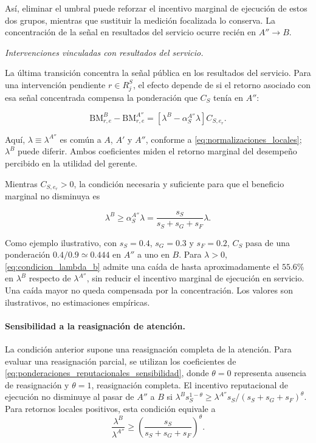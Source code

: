 Así, eliminar el umbral puede reforzar el incentivo marginal de ejecución de estos dos grupos, mientras que sustituir la medición focalizada lo conserva. La concentración de la señal en resultados del servicio ocurre recién en \(A''\to B\).

\medskip
\noindent\textbullet\enspace\textit{Intervenciones vinculadas con resultados del servicio.}
\par\smallskip

La última transición concentra la señal pública en los resultados del servicio. Para una intervención pendiente \(r\in R_j^{S}\), el efecto depende de si el retorno asociado con esa señal concentrada compensa la ponderación que \(C_S\) tenía en \(A''\):

\begin{equation}
\label{eq:diferencia_ejecucion_app_b_rs}
\mathrm{BM}_{r,e}^{B}-\mathrm{BM}_{r,e}^{A''}
=\left[\lambda^B-\alpha_S^{A''}\lambda\right]C_{S,e_r}.
\end{equation}

Aquí, \(\lambda\equiv\lambda^{A''}\) es común a \(A\), \(A'\) y \(A''\), conforme a \eqref{eq:normalizaciones_locales}; \(\lambda^B\) puede diferir. Ambos coeficientes miden el retorno marginal del desempeño percibido en la utilidad del gerente.

Mientras \(C_{S,e_r}>0\), la condición necesaria y suficiente para que el beneficio marginal no disminuya es

\begin{equation}
\label{eq:condicion_lambda_b}
\lambda^B
\geq
\alpha_S^{A''}\lambda
=
\frac{s_S}{s_S+s_G+s_F}\lambda.
\end{equation}

Como ejemplo ilustrativo, con \(s_S=0.4\), \(s_G=0.3\) y \(s_F=0.2\), \(C_S\) pasa de una ponderación \(0.4/0.9\simeq0.444\) en \(A''\) a uno en \(B\). Para \(\lambda>0\), \eqref{eq:condicion_lambda_b} admite una caída de hasta aproximadamente el \(55.6\%\) en \(\lambda^B\) respecto de \(\lambda^{A''}\), sin reducir el incentivo marginal de ejecución en servicio. Una caída mayor no queda compensada por la concentración. Los valores son ilustrativos, no estimaciones empíricas.

\paragraph{Sensibilidad a la reasignación de atención.}

La condición anterior supone una reasignación completa de la atención. Para evaluar una reasignación parcial, se utilizan los coeficientes de \eqref{eq:ponderaciones_reputacionales_sensibilidad}, donde \(\theta=0\) representa ausencia de reasignación y \(\theta=1\), reasignación completa. El incentivo reputacional de ejecución no disminuye al pasar de \(A''\) a \(B\) si \(\lambda^B s_S^{1-\theta}\geq\lambda^{A''}s_S/(s_S+s_G+s_F)^\theta\). Para retornos locales positivos, esta condición equivale a
\begin{equation}
\label{eq:condicion_lambda_theta}
\frac{\lambda^B}{\lambda^{A''}}
\geq
\left(\frac{s_S}{s_S+s_G+s_F}\right)^\theta.
\end{equation}

